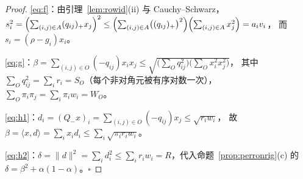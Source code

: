 \documentclass[UTF8,11pt]{ctexart}
\theoremstyle{definition}
\begin{document}
\begin{proof}
\eqref{eq:f}：由引理~\ref{lem:rowid}(ii) 与 Cauchy--Schwarz，
$s_i^2=\Bigl(\sum_{(i,j)\in A}(q_{ij})_+x_j\Bigr)^2\le
\Bigl(\sum_{(i,j)\in A}\bigl((q_{ij})_+\bigr)^2\Bigr)\Bigl(\sum_{(i,j)\in A}x_j^2\Bigr)=a_iv_i$，
而 $s_i=(\rho-g_i)x_i$。

\eqref{eq:g}：$\beta=\sum_{(i,j)\in O}(-q_{ij})x_ix_j\le
\sqrt{\bigl(\sum_Oq_{ij}^2\bigr)\bigl(\sum_Ox_i^2x_j^2\bigr)}$，
其中 $\sum_Oq_{ij}^2=\sum_ir_i=S_O$（每个非对角元被有序对数一次），$\sum_O\pi_i\pi_j=\sum_i\pi_iw_i=W_O$。

\eqref{eq:h1}：$d_i=(Q_-x)_i=\sum_{(i,j)\in O}(-q_{ij})x_j\le\sqrt{r_iw_i}$，
故 $\beta=\langle x,d\rangle=\sum_ix_id_i\le\sum_i\sqrt{\pi_ir_iw_i}$。

\eqref{eq:h2}：$\delta=\|d\|^2=\sum_id_i^2\le\sum_ir_iw_i=R$，代入命题~\ref{prop:perronrig}(c) 的
$\delta=\beta^2+\alpha(1-\alpha)$。$\square$
\end{proof}
\end{document}
